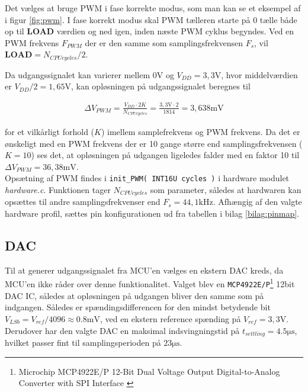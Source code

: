 Det vælges at bruge PWM i fase korrekte modus, som man kan se et eksempel af i figur \ref{fig:pwm}.
I fase korrekt modus skal PWM tælleren starte på 0 tælle både op til \textbf{LOAD} værdien og ned igen, inden næste PWM cyklus begyndes.
Ved en PWM frekvens $F_{PWM}$ der er den samme som samplingsfrekvensen $F_s$, vil $\textbf{LOAD} = N_{CPU cycles} / 2$.

Da udgangssignalet kan varierer mellem $ 0 \si{\volt}$ og $V_{DD} = 3,3 \si{\volt}$, hvor middelværdien er $V_{DD}/2 = 1,65 \si{\volt}$, kan opløsningen på udgangssignalet beregnes til 

\begin{align}
\Delta V_{PWM} = \frac{V_{DD} \cdot 2K}{N_{CPU cycles}} = \frac{3,3\si{\volt} \cdot 2}{1814} =  3,638\si{\milli\volt}
\end{align}

for et vilkårligt forhold ($K$) imellem samplefrekvens og PWM frekvens. 
Da det er ønskeligt med en PWM frekvens der er 10 gange større end samplingsfrekvensen ($K=10$) ses det, at opløsningen på udgangen ligeledes falder med en faktor 10 til $\Delta V_{PWM} = 36,38\si{\milli\volt}$.\\

Opsætning af PWM findes i \texttt{init\_PWM( INT16U cycles )} i hardware modulet \textit{hardware.c}. Funktionen tager $N_{CPU cycles}$ som parameter, således at hardwaren kan opsættes til andre samplingsfrekvenser end $F_s = 44,1\si{\kilo\hertz}$.
Afhængig af den valgte hardware profil, sættes pin konfigurationen ud fra tabellen i bilag \ref{bilag:pinmap}.  

\FloatBlock


\subsection{DAC}
Til at generer udgangssignalet fra MCU'en vælges en ekstern DAC kreds, da MCU'en ikke råder over denne funktionalitet.
Valget blev en \texttt{MCP4922E/P}\footnote{Microchip MCP4922E/P 12-Bit Dual Voltage Output Digital-to-Analog Converter with SPI Interface \cite{mcp4922} } 12bit DAC IC, således at opløsningen på udgangen bliver den samme som på indgangen.
Således er spændingsdifferencen for den mindst betydende bit $ V_{LSb} = V_{ref} / 4096 \approx \num{0,8}\si{\milli\volt} $, ved en ekstern reference spænding på $V_{ref} = 3,3\si{\volt}$.
Derudover har den valgte DAC en maksimal indsvingningstid på $t_{settling} = \num{4.5}\si{\micro\second}$, hvilket passer fint til samplingsperioden på $23\si{\micro\second}$. 


